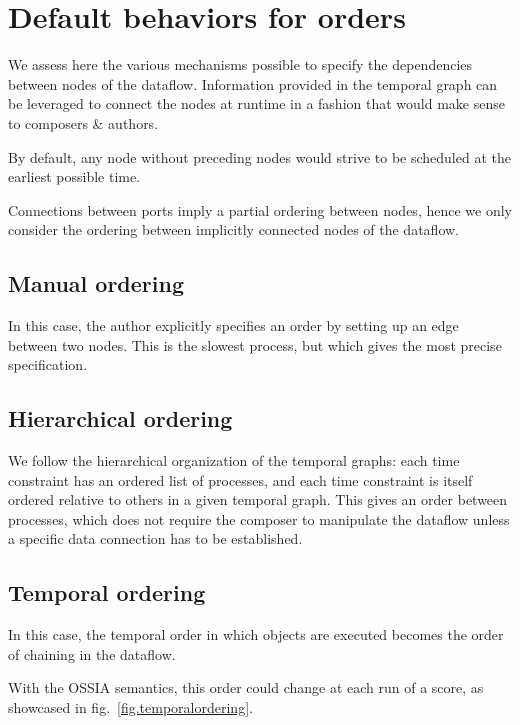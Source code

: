 \documentclass{article}
\begin{document}
\section{Default behaviors for orders}
\label{sec.order}
We assess here the various mechanisms possible to specify the dependencies between nodes of the dataflow.
Information provided in the temporal graph can be leveraged to connect the nodes at runtime in a fashion 
that would make sense to composers \& authors.
    
By default, any node without preceding nodes would strive to be scheduled at the earliest possible time.
    
Connections between ports imply a partial ordering between nodes, hence we only consider the ordering between implicitly connected nodes of the dataflow.
    
\subsection{Manual ordering}
In this case, the author explicitly specifies an order by setting up an edge between two nodes. 
This is the slowest process, but which gives the most precise specification.
    
\subsection{Hierarchical ordering}
We follow the hierarchical organization of the temporal graphs: each time constraint has an ordered list of processes, and each time constraint is itself ordered relative to others in a given temporal graph. 
This gives an order between processes, which does not require the composer to manipulate the dataflow unless a specific data connection has to be established.
    
\subsection{Temporal ordering}
In this case, the temporal order in which objects are executed
becomes the order of chaining in the dataflow.

With the OSSIA semantics, this order could change at each run of a score, as showcased in fig.~\ref{fig.temporalordering}.
    
\end{document}

